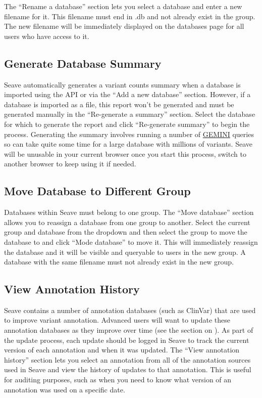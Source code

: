 \documentclass[11pt, a4paper]{article}
\newcommand{\GEMINI}{\href{https://gemini.readthedocs.io}{GEMINI} } %
\begin{document}
The ``Rename a database'' section lets you select a database and enter a new filename for it. This filename must end in .db and not already exist in the group. The new filename will be immediately displayed on the databases page for all users who have access to it.


\subsection{Generate Database Summary}

Seave automatically generates a variant counts summary when a database is imported using the API or via the ``Add a new database'' section. However, if a database is imported as a file, this report won't be generated and must be generated manually in the ``Re-generate a summary'' section. Select the database for which to generate the report and click ``Re-generate summary'' to begin the process. Generating the summary involves running a number of \GEMINI queries so can take quite some time for a large database with millions of variants. Seave will be unusable in your current browser once you start this process, switch to another browser to keep using it if needed.


\subsection{Move Database to Different Group}

Databases within Seave must belong to one group. The ``Move database'' section allows you to reassign a database from one group to another. Select the current group and database from the dropdown and then select the group to move the database to and click ``Mode database'' to move it. This will immediately reassign the database and it will be visible and queryable to users in the new group. A database with the same filename must not already exist in the new group.


\subsection{View Annotation History}

Seave contains a number of annotation databases (such as ClinVar) that are used to improve variant annotation. Advanced users will want to update these annotation databases as they improve over time (see the section on ). As part of the update process, each update should be logged in Seave to track the current version of each annotation and when it was updated. The ``View annotation history'' section lets you select an annotation from all of the annotation sources used in Seave and view the history of updates to that annotation. This is useful for auditing purposes, such as when you need to know what version of an annotation was used on a specific date.
\end{document}
